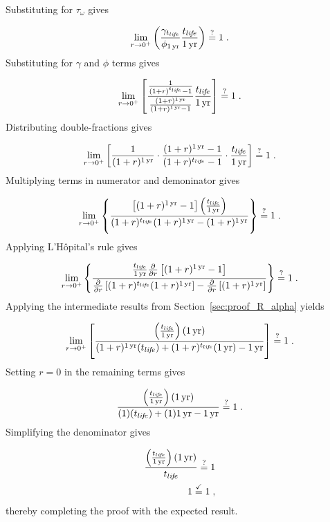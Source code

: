 Substituting for $\tau_\omega$ gives

\begin{equation}
  \lim_{r \to 0^+} \left( \frac{\gamma_{t_{li\!f\!e}}}{\phi_{1\,\mathrm{yr}}} \frac{t_{li\!f\!e}}{1\,\mathrm{yr}} \right) \stackrel{?}{=} 1 \; .
\end{equation}
%
Substituting for $\gamma$ and $\phi$ terms gives

\begin{equation}
  \lim_{r \to 0^+} \left[ \frac{\frac{1}{(1 + r)^{t_{li\!f\!e}} - 1}}{\frac{(1 + r)^{1\,\mathrm{yr}}}{(1 + r)^{1\,\mathrm{yr}} - 1}} \frac{t_{li\!f\!e}}{1\,\mathrm{yr}} \right] \stackrel{?}{=} 1 \; .
\end{equation}
%
Distributing double-fractions gives

\begin{equation}
  \lim_{r \to 0^+} \left[
  \frac{1}{(1 + r)^{1\,\mathrm{yr}}} \cdot
  \frac{(1 + r)^{1\,\mathrm{yr}} - 1}{(1 + r)^{t_{li\!f\!e}} - 1} \cdot
  \frac{t_{li\!f\!e}}{1\,\mathrm{yr}}
  \right] \stackrel{?}{=} 1 \; .
\end{equation}
%
Multiplying terms in numerator and demoninator gives

\begin{equation}
  \lim_{r \to 0^+} 
  \left\{
    \frac{\left[ (1 + r)^{1\,\mathrm{yr}} - 1 \right] \left( \frac{t_{li\!f\!e}}{1\,\mathrm{yr}} \right)}
    {(1 + r)^{t_{li\!f\!e}} (1 + r)^{1\,\mathrm{yr}} - (1 + r)^{1\,\mathrm{yr}}} 
  \right\} \stackrel{?}{=} 1 \; .
\end{equation}
%
Applying L'H\^{o}pital's rule gives

\begin{equation}
  \lim_{r \to 0^+} 
  \left\{
    \frac{\frac{t_{li\!f\!e}}{1\,\mathrm{yr}}
      \frac{\partial}{\partial r} 
        \left[ (1 + r)^{1\,\mathrm{yr}} - 1 \right]}
    {\frac{\partial}{\partial r} \left[ (1 + r)^{t_{li\!f\!e}} (1 + r)^{1\,\mathrm{yr}} \right] - 
     \frac{\partial}{\partial r} \left[ (1 + r)^{1\,\mathrm{yr}} \right]}
  \right\} \stackrel{?}{=} 1 \; .
\end{equation}
%
Applying the intermediate results from Section~\ref{sec:proof_R_alpha} yields

\begin{equation}
  \lim_{r \to 0^+} 
  \left[
    \frac{\left(\frac{t_{li\!f\!e}}{1\,\mathrm{yr}}\right) (1\,\mathrm{yr})}
         {(1 + r)^{1\,\mathrm{yr}} (t_{li\!f\!e}) + 
          (1 + r)^{t_{li\!f\!e}} (1\,\mathrm{yr}) - 
          1\,\mathrm{yr}}
  \right] \stackrel{?}{=} 1 \; .
\end{equation}
%
Setting $r = 0$ in the remaining terms gives

\begin{equation}
  \frac{\left( \frac{t_{li\!f\!e}}{1\,\mathrm{yr}} \right) (1\,\mathrm{yr})}
  {(1) (t_{li\!f\!e}) + (1) 1\,\mathrm{yr} - 1\,\mathrm{yr}} \stackrel{?}{=} 1 \; .
\end{equation}
%
Simplifying the denominator gives

\begin{align}
  \frac{\left( \frac{t_{li\!f\!e}}{1\,\mathrm{yr}} \right) (1\,\mathrm{yr})}
       {t_{li\!f\!e}} \stackrel{?}{=} 1 \\
       1 \stackrel{\checkmark}{=} 1 \; ,
\end{align}
%
thereby completing the proof with the expected result.
